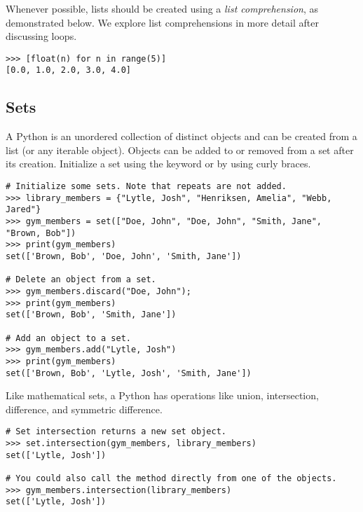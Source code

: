 Whenever possible, lists should be created using a \emph{list comprehension}, as demonstrated below.
We explore list comprehensions in more detail after discussing loops.
\begin{lstlisting}
>>> [float(n) for n in range(5)]
[0.0, 1.0, 2.0, 3.0, 4.0]
\end{lstlisting}



\subsection*{Sets}
A Python  is an unordered collection of distinct objects and can be created from a list (or any iterable object).
Objects can be added to or removed from a set after its creation.
Initialize a set using the keyword  or by using curly braces.
\begin{lstlisting}
# Initialize some sets. Note that repeats are not added.
>>> library_members = {"Lytle, Josh", "Henriksen, Amelia", "Webb, Jared"}
>>> gym_members = set(["Doe, John", "Doe, John", "Smith, Jane", "Brown, Bob"])
>>> print(gym_members)
set(['Brown, Bob', 'Doe, John', 'Smith, Jane'])

# Delete an object from a set.
>>> gym_members.discard("Doe, John");
>>> print(gym_members)
set(['Brown, Bob', 'Smith, Jane'])

# Add an object to a set.
>>> gym_members.add("Lytle, Josh")
>>> print(gym_members)
set(['Brown, Bob', 'Lytle, Josh', 'Smith, Jane'])
\end{lstlisting}

Like mathematical sets, a Python  has operations like union, intersection, 
difference, and symmetric difference.
\begin{lstlisting}
# Set intersection returns a new set object.
>>> set.intersection(gym_members, library_members)
set(['Lytle, Josh'])

# You could also call the method directly from one of the objects.
>>> gym_members.intersection(library_members)
set(['Lytle, Josh'])
\end{lstlisting}

